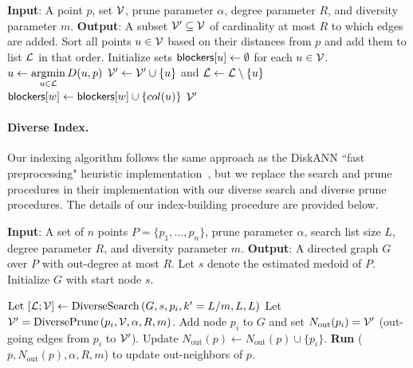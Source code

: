 \begin{algorithm}[h]
\caption{$\diverseprune(p, \mcV,\alpha,R,m)$}
\label{alg:colorprune}
\begin{algorithmic}[1]
\small
\STATE \textbf{Input}: A point $p$, set $\mathcal{V}$, prune parameter $\alpha$, degree parameter $R$, and diversity parameter $m$.
\STATE \textbf{Output}: A subset $\mathcal{V}' \subseteq \mathcal{V}$ of cardinality at most $R$ to which edges are added.
\STATE Sort all points $u\in \mathcal{V}$ based on their distances from $p$ and add them to list $\mathcal{L}$ in that order.
\STATE Initialize sets $\mathsf{blockers}[u] \gets \emptyset$ for each $u \in \mathcal{V}$.
        \STATE $u\gets \operatorname*{argmin}\limits_{u\in \mathcal{L}}D(u,p)$
        \STATE $\mathcal{V}' \gets \mathcal{V}' \cup \{u\}$ and $\mathcal{L} \gets \mathcal{L} \setminus \{u\}$
        \ENDIF
                \STATE $\mathsf{blockers}[w]\gets \mathsf{blockers}[w]\cup \{{ col}(u)\}$
                \ENDIF
            \ENDIF
        \ENDFOR
    \ENDWHILE
{} $\mathcal{V}'$
\end{algorithmic}
\end{algorithm}

\paragraph{Diverse Index.} Our indexing algorithm follows the same approach as the DiskANN ``fast preprocessing" heuristic implementation~\cite{DiskANN}, but we replace the search and prune procedures in their implementation with our diverse search and diverse prune procedures. The details of our index-building procedure are provided below.

\begin{algorithm}[h]
\caption{$\diverseindex(P,\alpha,L,R,m)$}
\label{alg:colorindex}
\begin{algorithmic}[1]
\small
\STATE \textbf{Input}: A set of $n$ points $P=\{p_1,\dots,p_{n} \}$, prune parameter $\alpha$, search list size $L$, degree parameter $R$, and  diversity parameter $m$.
\STATE \textbf{Output}: A directed graph $G$ over $P$ with out-degree at most $ R$.
    \STATE Let $s$ denote the estimated medoid of $P$.\;
    \STATE Initialize $G$ with start node $s$.\;
     
        \STATE $\text{Let } [\mathcal{L}; \mathcal{V}] \leftarrow \mathrm{DiverseSearch}\left(G,s, p_{i}, k' = L/m, L, L \right)$ \; 
        \STATE Let $\mathcal{V}' = \mathrm{DiversePrune}\left(p_i, \mathcal{V}, \alpha, R, m\right)$.
        \STATE Add node $p_i$ to $G$ and set $N_{\text{out}}(p_{i})= \mathcal{V}'$ (out-going edges from $p_i$ to $\mathcal{V}'$).\;
            \STATE $\text{Update } N_{\text{out}}(p) \leftarrow N_{\text{out}}(p) \cup \{p_i\}$.\;
                \STATE \textbf{Run} \diverseprune($p, N_{\text{out}}(p), \alpha, R,m$) to update out-neighbors of  $p$.\;
                \ENDIF
\ENDFOR
\ENDFOR
\end{algorithmic}
\end{algorithm}
